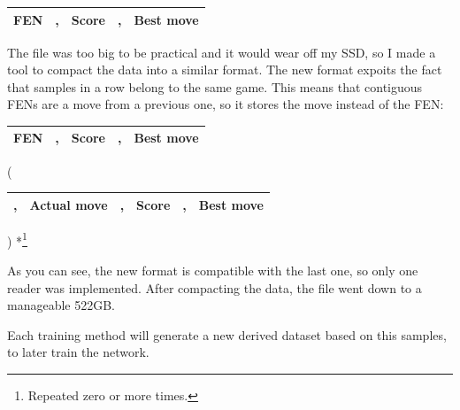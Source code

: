\begin{center}
\begin{tabular}{|cp{0.0005cm}cp{0.0005cm}c|}
\hline
\textbf{FEN\footnotemark} & , & \textbf{Score} & , & \textbf{Best move} \\
\hline
\end{tabular}
\end{center}


The file was too big to be practical and it would wear off my SSD, so I made a tool to compact the data into a similar format. The new format expoits the fact that samples in a row belong to the same game. This means that contiguous FENs are a move from a previous one, so it stores the move instead of the FEN:

\begin{center}
\begin{tabular}{|cp{0.0005cm}cp{0.0005cm}c|}
\hline
\textbf{FEN} & , & \textbf{Score} & , & \textbf{Best move} \\
\hline
\end{tabular}
(
\begin{tabular}{|p{0.0005cm}cp{0.0005cm}cp{0.0005cm}c|}
\hline
, & \textbf{Actual move} & , & \textbf{Score} & , & \textbf{Best move} \\
\hline
\end{tabular}
) *\footnote{Repeated zero or more times.}
\end{center}

As you can see, the new format is compatible with the last one, so only one reader was implemented. After compacting the data, the file went down to a manageable 522GB.

Each training method will generate a new derived dataset based on this samples, to later train the network.


